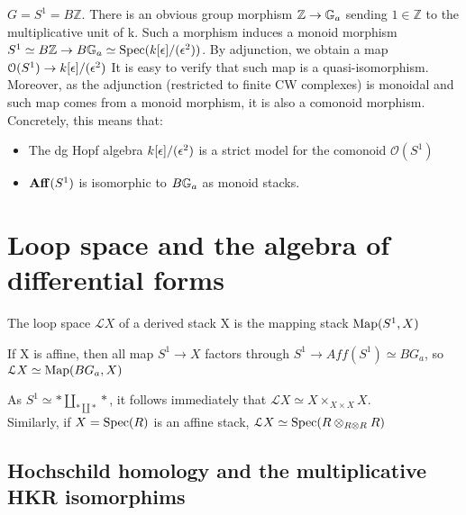 \begin{refsection}
\begin{example}
\label{formality}
$G=S^1=B\mathbb{Z}$. There is an obvious group morphism $\mathbb{Z}\to \mathbb{G}_a$ sending $1\in\mathbb{Z}$ to the multiplicative unit of k. Such a morphism induces
a monoid morphism $S^1\simeq B\mathbb{Z}\to B\mathbb{G}_a\simeq \mathrm{Spec}(k[\epsilon]/(\epsilon^2))$. By adjunction, we obtain a map $\mathcal{O}(S^1)\to k[\epsilon]/(\epsilon^2)$
It is easy to verify that such map is a quasi-isomorphism. Moreover, as the adjunction (restricted to finite CW complexes) is monoidal and such map comes from a monoid
morphism, it is also a comonoid morphism. Concretely, this means that:
\begin{itemize}
 \item The dg Hopf algebra $k[\epsilon]/(\epsilon^2)$ is a strict model for the comonoid $\mathcal{O}(S^1)$
\item $\mathbf{Aff}(S^1)$ is isomorphic to $B\mathbb{G}_a$ as monoid stacks.
\end{itemize}

\end{example}



\section{Loop space and the algebra of differential forms}
\label{loop}
\begin{definition}
The loop space $\mathcal{L}X$ of a derived stack X is the mapping stack $\operatorname{\mathrm{Map}}(S^1,X)$
\end{definition}

\begin{remark}
If X is affine, then all map $S^1\to X$ factors through $S^1\to Aff(S^1)\simeq BG_a$, so\\ $\mathcal{L}X\simeq \operatorname{\mathrm{Map}}(BG_a,X)$
\end{remark}


\begin{remark}
As $\displaystyle S^1\simeq *\coprod_{*\coprod *}*$, it follows immediately that $\mathcal{L}X\simeq X\times_{X\times X}X$.\\
Similarly, if $X=\mathrm{Spec}(R)$ is an affine stack, $\mathcal{L}X\simeq \mathrm{Spec}(R\otimes_{R\otimes R}R)$
\end{remark}

\subsection{Hochschild homology and the multiplicative HKR isomorphims}


\end{refsection}
